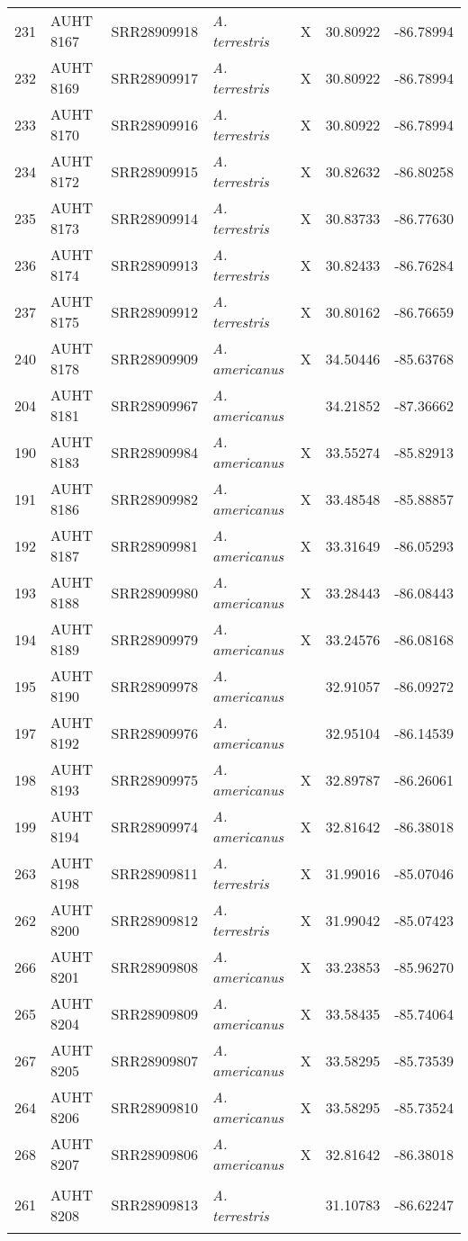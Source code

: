\begin{longtable}{ lllllll }
231 & AUHT 8167 & SRR28909918 & \textit{A. terrestris} & X & 30.80922 & -86.78994 \\ 
232 & AUHT 8169 & SRR28909917 & \textit{A. terrestris} & X & 30.80922 & -86.78994 \\ 
233 & AUHT 8170 & SRR28909916 & \textit{A. terrestris} & X & 30.80922 & -86.78994 \\ 
234 & AUHT 8172 & SRR28909915 & \textit{A. terrestris} & X & 30.82632 & -86.80258 \\ 
235 & AUHT 8173 & SRR28909914 & \textit{A. terrestris} & X & 30.83733 & -86.77630 \\ 
236 & AUHT 8174 & SRR28909913 & \textit{A. terrestris} & X & 30.82433 & -86.76284 \\ 
237 & AUHT 8175 & SRR28909912 & \textit{A. terrestris} & X & 30.80162 & -86.76659 \\ 
240 & AUHT 8178 & SRR28909909 & \textit{A. americanus} & X & 34.50446 & -85.63768 \\ 
204 & AUHT 8181 & SRR28909967 & \textit{A. americanus} &  & 34.21852 & -87.36662 \\ 
190 & AUHT 8183 & SRR28909984 & \textit{A. americanus} & X & 33.55274 & -85.82913 \\ 
191 & AUHT 8186 & SRR28909982 & \textit{A. americanus} & X & 33.48548 & -85.88857 \\ 
192 & AUHT 8187 & SRR28909981 & \textit{A. americanus} & X & 33.31649 & -86.05293 \\ 
193 & AUHT 8188 & SRR28909980 & \textit{A. americanus} & X & 33.28443 & -86.08443 \\ 
194 & AUHT 8189 & SRR28909979 & \textit{A. americanus} & X & 33.24576 & -86.08168 \\ 
195 & AUHT 8190 & SRR28909978 & \textit{A. americanus} &  & 32.91057 & -86.09272 \\ 
197 & AUHT 8192 & SRR28909976 & \textit{A. americanus} &  & 32.95104 & -86.14539 \\ 
198 & AUHT 8193 & SRR28909975 & \textit{A. americanus} & X & 32.89787 & -86.26061 \\ 
199 & AUHT 8194 & SRR28909974 & \textit{A. americanus} & X & 32.81642 & -86.38018 \\ 
263 & AUHT 8198 & SRR28909811 & \textit{A. terrestris} & X & 31.99016 & -85.07046 \\ 
262 & AUHT 8200 & SRR28909812 & \textit{A. terrestris} & X & 31.99042 & -85.07423 \\ 
266 & AUHT 8201 & SRR28909808 & \textit{A. americanus} & X & 33.23853 & -85.96270 \\ 
265 & AUHT 8204 & SRR28909809 & \textit{A. americanus} & X & 33.58435 & -85.74064 \\ 
267 & AUHT 8205 & SRR28909807 & \textit{A. americanus} & X & 33.58295 & -85.73539 \\ 
264 & AUHT 8206 & SRR28909810 & \textit{A. americanus} & X & 33.58295 & -85.73524 \\ 
268 & AUHT 8207 & SRR28909806 & \textit{A. americanus} & X & 32.81642 & -86.38018 \\ 
261 & AUHT 8208 & SRR28909813 & \textit{A. terrestris} &  & 31.10783 & -86.62247

\label{table:collectedHyb}
\end{longtable}